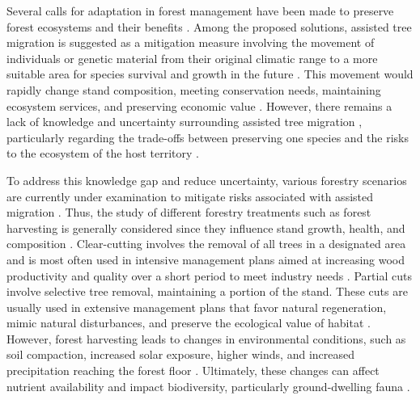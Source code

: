 Several calls for adaptation in forest management have been made to preserve forest ecosystems and their benefits \citep{Messier2021sakeresilience,Nagel2017Adaptivesilviculture}. 
Among the proposed solutions, assisted tree migration is suggested as a mitigation measure involving the movement of individuals or genetic material from their original climatic range to a more suitable area for species survival and growth in the future \citep{Dumroese2015Considerationsrestoring,Palik2022Operationalizingforestassisted,Park2023Provenancetrials,Park2018Informationunderload,Pedlar2011implementationassisted,Vitt2010Assistedmigration,Williams2013Preparingclimate}. 
This movement would rapidly change stand composition, meeting conservation needs, maintaining ecosystem services, and preserving economic value \citep{Pedlar2011implementationassisted,Ste-Marie2011Assistedmigration,Winder2011Ecologicalimplications}. 
However, there remains a lack of knowledge and uncertainty surrounding assisted tree migration \citep{Park2018Informationunderload,Klenk2015assistedmigration}, particularly regarding the trade-offs between preserving one species and the risks to the ecosystem of the host territory \citep{Hewitt2011Takingstock,McLachlan2007frameworkdebate,Vitt2010Assistedmigration}.

To address this knowledge gap and reduce uncertainty, various forestry scenarios are currently under examination to mitigate risks associated with assisted migration \citep{royoDesiredREgenerationAssisted2023}. 
Thus, the study of different forestry treatments such as forest harvesting is generally considered since they influence stand growth, health, and composition \citep{Ameray2021Forestcarbon,Chaudhary2016Impactforest,Man2008Elevenyearresponses,MontoroGirona2018ConiferRegeneration,PamerleauCouture2015Effectthree}. 
Clear-cutting involves the removal of all trees in a designated area and is most often used in intensive management plans aimed at increasing wood productivity and quality over a short period to meet industry needs \citep{Ameray2021Forestcarbon}. 
Partial cuts involve selective tree removal, maintaining a portion of the stand. 
These cuts are usually used in extensive management plans that favor natural regeneration, mimic natural disturbances, and preserve the ecological value of habitat \citep{Ameray2021Forestcarbon,Barg1999Influencepartial,Irland2011Timberproductivity,Tong2020Forestmanagement}. 
However, forest harvesting leads to changes in environmental conditions, such as soil compaction, increased solar exposure, higher winds, and increased precipitation reaching the forest floor \citep{Keenan1993ecologicaleffects,Lindo2003Microbialbiomass,Heithecker2007Edgerelatedgradients}. 
Ultimately, these changes can affect nutrient availability and impact biodiversity, particularly ground-dwelling fauna \citep{Battigelli2004Shorttermimpact,Chaudhary2016Impactforest,Covington1981Changesforest,Fedrowitz2014Canretention,Kudrin2023metaanalysiseffects,Lindo2003Microbialbiomass,Paillet2010Biodiversitydifferences,rousseauLongtermEffectsBiomass2018}.

